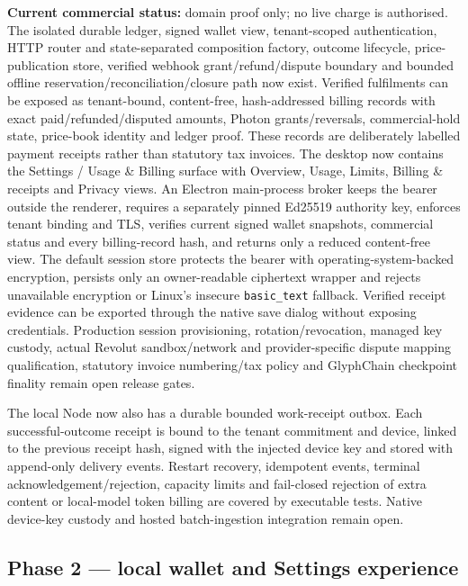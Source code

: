 \documentclass[11pt]{article}
\begin{document}
\noindent\textbf{Current commercial status:} domain proof only; no live charge is authorised. The isolated durable ledger, signed wallet view, tenant-scoped authentication, HTTP router and state-separated composition factory, outcome lifecycle, price-publication store, verified webhook grant/refund/dispute boundary and bounded offline reservation/reconciliation/closure path now exist. Verified fulfilments can be exposed as tenant-bound, content-free, hash-addressed billing records with exact paid/refunded/disputed amounts, Photon grants/reversals, commercial-hold state, price-book identity and ledger proof. These records are deliberately labelled payment receipts rather than statutory tax invoices. The desktop now contains the Settings / Usage \& Billing surface with Overview, Usage, Limits, Billing \& receipts and Privacy views. An Electron main-process broker keeps the bearer outside the renderer, requires a separately pinned Ed25519 authority key, enforces tenant binding and TLS, verifies current signed wallet snapshots, commercial status and every billing-record hash, and returns only a reduced content-free view. The default session store protects the bearer with operating-system-backed encryption, persists only an owner-readable ciphertext wrapper and rejects unavailable encryption or Linux's insecure \texttt{basic\_text} fallback. Verified receipt evidence can be exported through the native save dialog without exposing credentials. Production session provisioning, rotation/revocation, managed key custody, actual Revolut sandbox/network and provider-specific dispute mapping qualification, statutory invoice numbering/tax policy and GlyphChain checkpoint finality remain open release gates.

The local Node now also has a durable bounded work-receipt outbox. Each successful-outcome receipt is bound to the tenant commitment and device, linked to the previous receipt hash, signed with the injected device key and stored with append-only delivery events. Restart recovery, idempotent events, terminal acknowledgement/rejection, capacity limits and fail-closed rejection of extra content or local-model token billing are covered by executable tests. Native device-key custody and hosted batch-ingestion integration remain open.

\subsection{Phase 2 --- local wallet and Settings experience}
\end{document}
